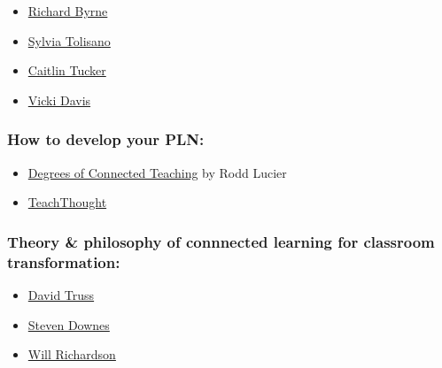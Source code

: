 \begin{itemize}
\item
  \href{http://www.freetech4teachers.com/}{Richard Byrne}
\item
  \href{http://langwitches.org/blog/}{Sylvia Tolisano}
\item
  \href{http://catlintucker.com/2011/11/12-tech-tools-that-will-transform-your-classroom/}{Caitlin
  Tucker}
\item
  \href{http://coolcatteacher.blogspot.ca/}{Vicki Davis}
\end{itemize}
\subsubsection{How to develop your PLN:}

\begin{itemize}
\item
  \href{\%20http://thecleversheep.blogspot.ca/2012/06/seven-degrees-of-connectedness\_06.html}{Degrees
  of Connected Teaching} by Rodd Lucier
\item
  \href{\%20http://thecleversheep.blogspot.ca/2012/06/seven-degrees-of-connectedness\_06.html}{TeachThought}
\end{itemize}
\subsubsection{Theory \& philosophy of connnected learning for classroom
transformation:}

\begin{itemize}
\item
  \href{http://pairadimes.davidtruss.com/}{David Truss}
\item
  \href{http://www.downes.ca/presentation/264}{Steven Downes}
\item
  \href{http://willrichardson.com/}{Will Richardson}
\end{itemize}
